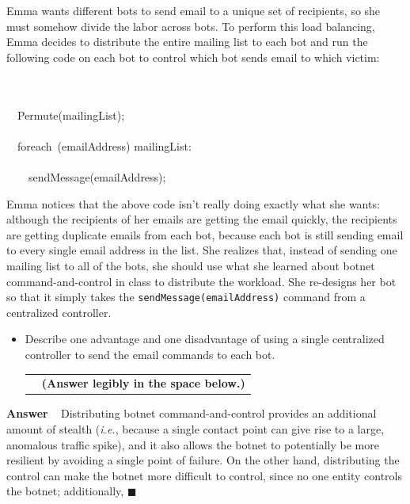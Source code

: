 \documentclass[11pt]{article}
\newcounter{pctr}
\newcommand{\ie}{{\em i.e.}}
\newcommand{\ansbelow}{\probnote{Answer legibly in the space below.}}
\newcommand{\sols}[1]{#1}
\newcommand{\sols}[1]{}
\newcounter{answer}
\newenvironment{answer}[1][\relax]{\refstepcounter{answer}\begin{list}%
 {}{\leftmargin 0pt\rightmargin 0pt\labelsep 3pt\parsep 0pt%
 \setlength{\listparindent}{\parindent}}
    \item {\bf Answer \theanswer #1}\
    }{\hspace*{\fill}$\blacksquare$\end{list}}
\newcommand\prob[1]%
  {\begin{itemize}\item[]%
   \vspace{.2in}{\bf\thepctr. ~[#1~ points]:}\stepcounter{pctr}}
\newcommand\eprob{\end{itemize}}
\newcommand\probnote[1]%
  {\\\begin{tabular}{cr} \hspace{3in} & {\bf (#1)} \\ \end{tabular}}
\begin{document}
Emma wants different bots to send email to a unique set of recipients,
so she must somehow divide the labor across bots.  To perform this load
balancing, Emma decides to distribute the entire mailing list to each
bot and run the following code on each bot to control which bot sends
email to which victim: 

\begin{center}
\begin{minipage}{4.5in}
\begin{pseudocode}[display]{}{}
\\
 \\
  ~~Permute(mailingList); \\ \\

  ~~\mbox{foreach}~(emailAddress) \in mailingList: \\ 

  ~~~~\\
  ~~~~sendMessage(emailAddress);\\
\ENDPROCEDURE
\end{pseudocode}
\end{minipage}
\end{center}

Emma notices that the above code isn't really doing exactly what she
wants: although the recipients of her emails are getting the email
quickly, the recipients are getting duplicate emails from each bot,
because each bot is still sending email to every single email address in
the list.  She realizes that, instead of sending one mailing list to all
of the bots, she should use what she learned about botnet
command-and-control in class to distribute the workload.  She re-designs
her bot so that it simply takes the {\tt sendMessage(emailAddress)}
command from a centralized controller.

\prob{2}
Describe one advantage and one disadvantage of using a single
centralized controller to send the email commands to each bot. 
\ansbelow
\eprob
\sols{
\begin{answer}
Distributing botnet command-and-control provides an additional amount of
stealth (\ie, because a single contact point can give rise to a large,
anomalous traffic spike), and it also allows the botnet to potentially
be more resilient by avoiding a single point of failure.  On the other
hand, distributing the control can make the botnet more difficult to
control, since no one entity controls the botnet; additionally, 
\end{answer}
}
\end{document}

